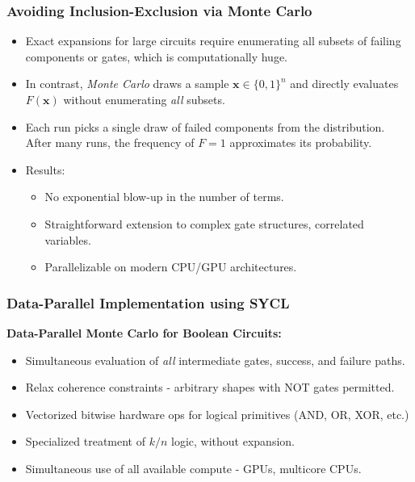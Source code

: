 \begin{frame}[t, allowframebreaks]
\frametitle{Avoiding Inclusion-Exclusion via Monte Carlo}
\begin{itemize}
  \item Exact expansions for large circuits require enumerating all subsets of failing components or gates, which is computationally huge.
  \item In contrast, \emph{Monte Carlo} draws a sample \(\mathbf{x}\in \{0,1\}^n\) and directly evaluates \(F(\mathbf{x})\) without enumerating \emph{all} subsets.
  \item Each run picks a single draw of failed components from the distribution. After many runs, the frequency of \(F=1\) approximates its probability.
  \item Results:
    \begin{itemize}
      \item No exponential blow-up in the number of terms.
      \item Straightforward extension to complex gate structures, correlated variables.
      \item Parallelizable on modern CPU/GPU architectures.
    \end{itemize}
\end{itemize}
\end{frame}

\begin{frame}[t, allowframebreaks]
\frametitle{Data-Parallel Implementation using SYCL}
\item \textbf{Data-Parallel Monte Carlo for Boolean Circuits:}
  \begin{itemize}
    \item{Simultaneous evaluation of \emph{all} intermediate gates, success, and failure paths.}
    \item{Relax coherence constraints - arbitrary shapes with NOT gates permitted.}
    \item{Vectorized bitwise hardware ops for logical primitives (AND, OR, XOR, etc.)}
    \item{Specialized treatment of \(k/n\) logic, without expansion.}
    \item{Simultaneous use of all available compute - GPUs, multicore CPUs.}
    \vspace{16pt}
  \end{itemize}
\end{frame}